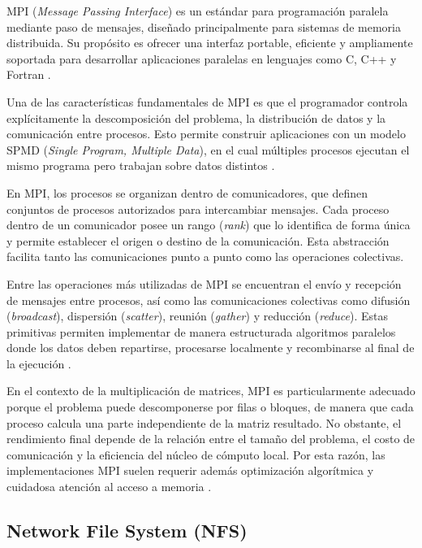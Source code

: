MPI (\textit{Message Passing Interface}) es un estándar para programación paralela mediante paso de mensajes, diseñado principalmente para sistemas de memoria distribuida. Su propósito es ofrecer una interfaz portable, eficiente y ampliamente soportada para desarrollar aplicaciones paralelas en lenguajes como C, C++ y Fortran \parencite{snir1998mpi2,mpiForum2021}.

Una de las características fundamentales de MPI es que el programador controla explícitamente la descomposición del problema, la distribución de datos y la comunicación entre procesos. Esto permite construir aplicaciones con un modelo SPMD (\textit{Single Program, Multiple Data}), en el cual múltiples procesos ejecutan el mismo programa pero trabajan sobre datos distintos \parencite{gropp2014usingmpi}.

En MPI, los procesos se organizan dentro de comunicadores, que definen conjuntos de procesos autorizados para intercambiar mensajes. Cada proceso dentro de un comunicador posee un rango (\textit{rank}) que lo identifica de forma única y permite establecer el origen o destino de la comunicación. Esta abstracción facilita tanto las comunicaciones punto a punto como las operaciones colectivas.

Entre las operaciones más utilizadas de MPI se encuentran el envío y recepción de mensajes entre procesos, así como las comunicaciones colectivas como difusión (\textit{broadcast}), dispersión (\textit{scatter}), reunión (\textit{gather}) y reducción (\textit{reduce}). Estas primitivas permiten implementar de manera estructurada algoritmos paralelos donde los datos deben repartirse, procesarse localmente y recombinarse al final de la ejecución \parencite{mpiForum2021}.

En el contexto de la multiplicación de matrices, MPI es particularmente adecuado porque el problema puede descomponerse por filas o bloques, de manera que cada proceso calcula una parte independiente de la matriz resultado. No obstante, el rendimiento final depende de la relación entre el tamaño del problema, el costo de comunicación y la eficiencia del núcleo de cómputo local. Por esta razón, las implementaciones MPI suelen requerir además optimización algorítmica y cuidadosa atención al acceso a memoria \parencite{snir1998mpi2,pacheco1997parallel}.

\subsection{Network File System (NFS)}


